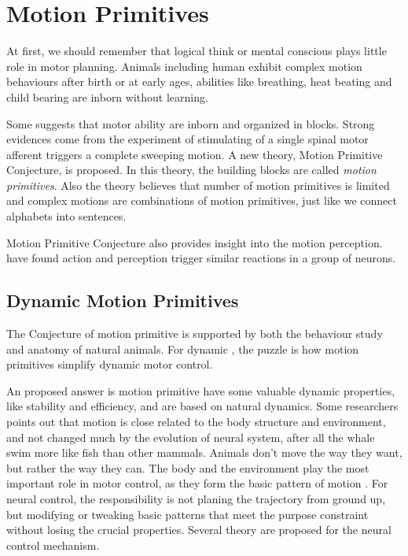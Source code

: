 \section{Motion Primitives}
At first, we should remember that logical think or mental conscious plays little role in motor planning.
Animals including human exhibit complex motion behaviours after birth or at early ages, abilities like breathing, heat beating and child bearing are inborn without learning.

Some suggests that motor ability are inborn and organized in blocks\citep{bizzi1995modular,bizzi2002book}.
Strong evidences come from the experiment of stimulating of a single spinal motor afferent triggers a complete sweeping motion\citep{bizzi1995modular}.
A new theory, Motion Primitive Conjecture, is proposed.
In this theory, the building blocks are called \emph{motion primitives}.
Also the theory believes that number of motion primitives is limited and
complex motions are combinations of motion primitives, just like we connect alphabets into sentences.

Motion Primitive Conjecture also provides insight into the motion perception.
\citet{gallese1996action} have found action and perception trigger similar reactions in a group of neurons.





\subsection{Dynamic Motion Primitives}
The Conjecture of motion primitive is supported by both the behaviour study and anatomy of natural animals.
For dynamic \cms, the puzzle is how motion primitives simplify dynamic motor control.

An proposed answer is motion primitive have some valuable dynamic properties, like stability and efficiency, and are based on natural dynamics.
Some researchers points out that motion is close related to the body structure and environment,
and not changed much by the evolution of neural system, after all the whale swim more like fish than other mammals.
Animals don’t move the way they want, but rather the way they can. 
The body and the environment play the most important role in motor control, as they form the basic pattern of motion \citep{nishikawa2007neuromechanics}.
For neural control, the responsibility is not planing the trajectory from ground up, but modifying or tweaking basic patterns that meet the purpose constraint without losing the crucial properties.
Several theory are proposed for the neural control mechanism.

